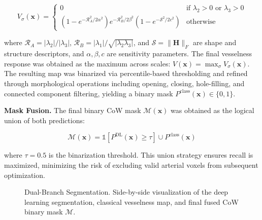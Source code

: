 \begin{equation}
    V_\sigma(\mathbf{x}) = \begin{cases}
        0 & \text{if } \lambda_2 > 0 \text{ or } \lambda_3 > 0 \\[6pt]
        \left(1 - e^{-\mathcal{R}_A^2 / 2\alpha^2}\right)
        e^{-\mathcal{R}_B^2 / 2\beta^2}
        \left(1 - e^{-\mathcal{S}^2 / 2c^2}\right) & \text{otherwise}
    \end{cases}
\end{equation}

where $\mathcal{R}_A = |\lambda_2|/|\lambda_3|$, $\mathcal{R}_B = |\lambda_1|/\sqrt{|\lambda_2 \lambda_3|}$, and $\mathcal{S} = \|\mathbf{H}\|_F$ are shape and structure descriptors, and $\alpha, \beta, c$ are sensitivity parameters. The final vesselness response was obtained as the maximum across scales: $V(\mathbf{x}) = \max_\sigma V_\sigma(\mathbf{x})$. The resulting map was binarized via percentile-based thresholding and refined through morphological operations including opening, closing, hole-filling, and connected component filtering, yielding a binary mask $P^{\text{class}}(\mathbf{x}) \in \{0, 1\}$.

\textbf{Mask Fusion.} The final binary CoW mask $\mathcal{M}(\mathbf{x})$ was obtained as the logical union of both predictions:

\begin{equation}
    \mathcal{M}(\mathbf{x}) = \mathbb{1}\left[P^{\text{DL}}(\mathbf{x}) \geq \tau\right] \cup P^{\text{class}}(\mathbf{x})
\end{equation}

where $\tau = 0.5$ is the binarization threshold. This union strategy ensures recall is maximized, minimizing the risk of excluding valid arterial voxels from subsequent optimization.

\begin{figure}[h]
    \centering
    \caption{Dual-Branch Segmentation. Side-by-side visualization of the deep learning segmentation, classical vesselness map, and final fused CoW binary mask $\mathcal{M}$.}
    \label{fig:segmentation}
\end{figure}

